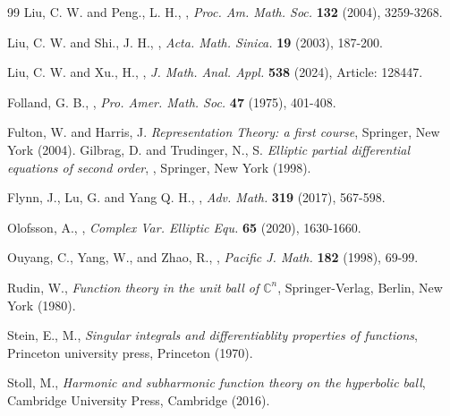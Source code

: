 \documentclass[a4paper,11pt]{amsart}
\numberwithin{equation}{section}
\begin{document}
\begin{thebibliography}{99}
Liu, C. W. and Peng., L. H.,
,
{\it Proc. Am. Math. Soc. } \textbf{132} (2004), 3259-3268.

Liu, C. W. and Shi., J. H.,
,
{\it Acta. Math. Sinica.} \textbf{19} (2003), 187-200.

Liu, C. W. and Xu., H.,
,
{\it J. Math. Anal. Appl. } \textbf{538} (2024), Article: 128447.

Folland, G. B.,
, {\it  Pro. Amer. Math. Soc.} \textbf{47} (1975), 401-408.

Fulton, W. and Harris, J.
{\it Representation Theory: a first course}, {\rm Springer, New York} (2004).
Gilbrag, D. and Trudinger, N., S.
{\it Elliptic partial differential equations of second order}, , {\rm Springer, New York} (1998).

Flynn, J., Lu, G. and Yang Q. H.,
, {\it Adv. Math.} \textbf{319} (2017), 567-598.

Olofsson, A.,
,  {\it Complex Var. Elliptic Equ.} \textbf{65} (2020), 1630-1660.

Ouyang, C., Yang,  W., and Zhao, R.,
,  {\it  Pacific J. Math.} \textbf{182} (1998), 69-99.

Rudin, W., {\it Function theory in the unit ball of $\mathbb{C}^n$}, {\rm Springer-Verlag, Berlin, New York} (1980).

Stein, E., M.,
{\it Singular integrals and differentiablity properties of functions}, {\rm Princeton university press}, Princeton (1970).

Stoll, M.,
{\it Harmonic and subharmonic function theory on the hyperbolic ball}, {\rm  Cambridge University Press, Cambridge} (2016).


\end{thebibliography}
\end{document}
